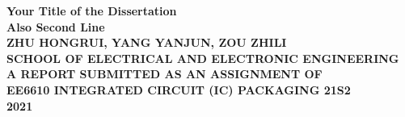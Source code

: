 \begin{titlepage}
	\begin{center}
		\vspace*{2in}
		\Huge{\textbf{Your Title of the Dissertation\\Also Second Line}}\\[2.5in]
		
		\LARGE{\textbf{\MakeUppercase{ZHU HONGRUI, YANG YANJUN, ZOU ZHILI}}}\\[1in]
		
		\normalsize{\textbf{\MakeUppercase{SCHOOL OF ELECTRICAL AND ELECTRONIC ENGINEERING}}}\\[0.5in]
		\normalsize{\textbf{\MakeUppercase{A REPORT SUBMITTED AS AN ASSIGNMENT OF\\EE6610 INTEGRATED CIRCUIT (IC) PACKAGING 21S2}}}\\[0.75in]
		
		
		\large{\textbf{2021}}
	\end{center}
\end{titlepage}
\newpage